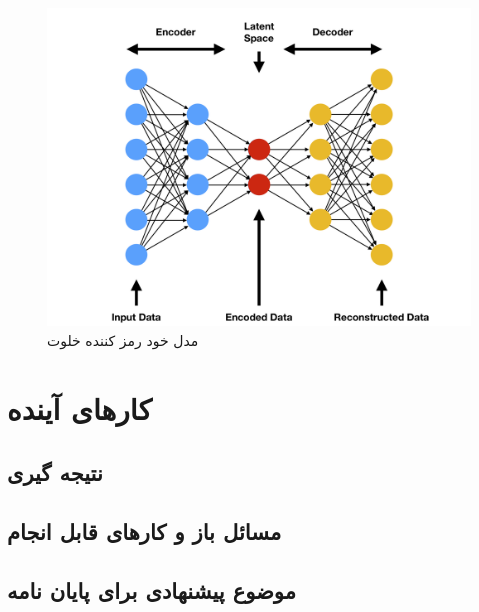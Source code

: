 \documentclass[12pt,a4paper]{report}
\theoremstyle{definition}
\theoremstyle{definition}
\begin{document}
\begin{figure}[!h]
	\begin{center}
		\includegraphics[width=0.6\linewidth]{./images/figures/ae.png}
	\end{center}
	\caption{مدل خود رمز کننده خلوت}
	\label{fig:ae}
	\centering
\end{figure}

	\chapter{کار‌های آینده}
	\section{نتیجه گیری}
	\section{مسائل باز و کارهای قابل انجام}
	\section{موضوع پیشنهادی برای پایان نامه}
	
	
	\newpage


\end{document}

